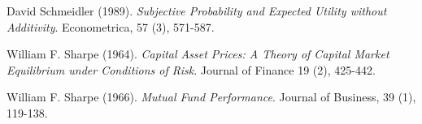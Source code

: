 \documentclass[10pt]{article}
\begin{document}
\begin{thebibliography}{99}

 David Schmeidler (1989). {\it Subjective Probability and Expected Utility without Additivity}. Econometrica, 57 (3), 571-587.

 William F. Sharpe (1964). {\it Capital Asset Prices: A Theory of Capital Market Equilibrium under Conditions of Risk}. Journal of Finance 19 (2), 425-442.

 William F. Sharpe (1966). {\it Mutual Fund Performance}. Journal of Business, 39 (1), 119-138.

\end{thebibliography}
\end{document}
